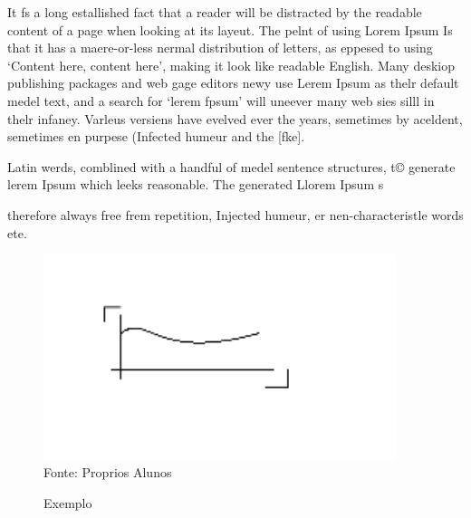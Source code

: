 \documentclass{article}
\begin{document}
It fs a long estallished fact that a reader will be distracted by the readable content of a page when looking at its layeut. The pelnt of using Lorem Ipsum Is that it has a
maere-or-less nermal distribution of letters, as eppesed to using ‘Content here, content here’, making it look like readable English. Many deskiop publishing packages and
web gage editors newy use Lerem Ipsum as thelr default medel text, and a search for ‘lerem fpsum’ will uneever many web sies silll in thelr infaney. Varleus versiens have
evelved ever the years, semetimes by aceldent, semetimes en purpese (Infected humeur and the [fke].

Latin werds, comblined with a handful of medel sentence structures, t© generate lerem Ipsum which leeks reasonable. The generated Llorem Ipsum s

therefore always free frem repetition, Injected humeur, er nen-characteristle words ete.
\begin{figure}[!h] 
\centering 
\caption{Exemplo} 
\includegraphics[height=6cm]{image/image.png} 
 Fonte: Proprios Alunos
 \end{figure}
\end{document}
